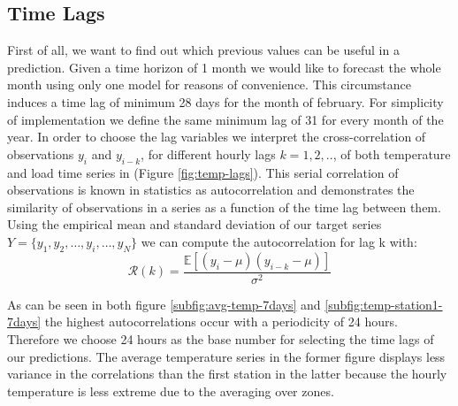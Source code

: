 \documentclass[conference]{IEEEtran}
\begin{document}
\subsection{Time Lags}
\label{sec:time-lags}
First of all, we want to find out which previous values can be useful in a prediction. Given a time horizon of 1 month we would like to forecast the whole month using only one model for reasons of convenience. This circumstance induces a time lag of minimum 28 days for the month of february. For simplicity of implementation we define the same minimum lag of 31 for every month of the year.   
In order to choose the lag variables we interpret the cross-correlation of observations $y_i$ and $y_{i-k}$, for different hourly lags $k=1,2,..$, of both temperature and load time series in (Figure \ref{fig:temp-lags}).
This serial correlation of observations is known in statistics as autocorrelation and demonstrates the similarity of observations in a series as a function of the time lag between them.
Using the empirical mean and standard deviation of our target series $Y=\{y_1, y_2, \dots, y_i, \dots, y_N\}$ we can compute the autocorrelation for lag k with:
\[
  \mathcal{R}(k)=\frac{\mathbb{E}\left[(y_i-\mu)(y_{i-k}-\mu)\right]}{\sigma^2}
\]

As can be seen in both figure \ref{subfig:avg-temp-7days} and \ref{subfig:temp-station1-7days} the highest autocorrelations occur with a periodicity of 24 hours. Therefore we choose 24 hours as the base number for selecting the time lags of our predictions. The average temperature series in the former figure displays less variance in the correlations than the first station in the latter because the hourly temperature is less extreme due to the averaging over zones. 
\end{document}
